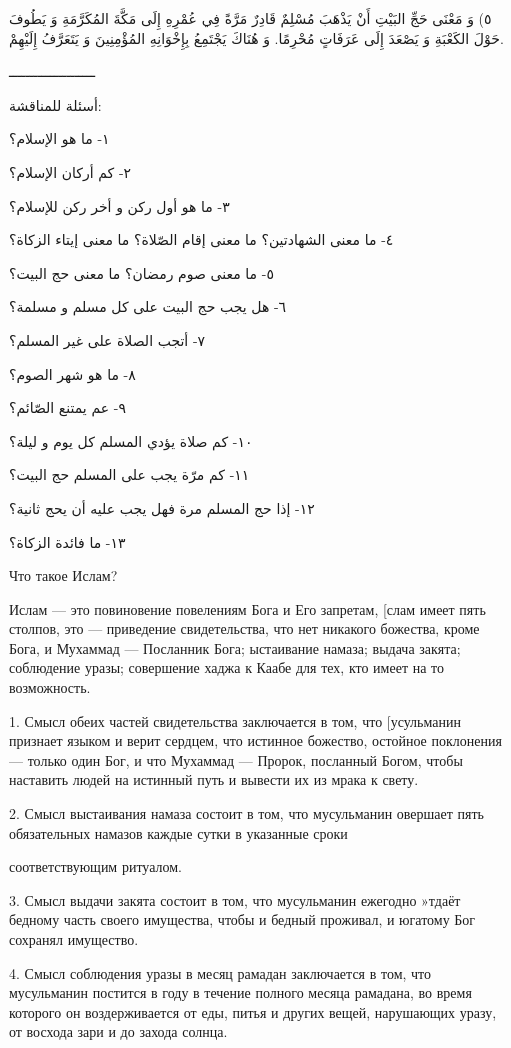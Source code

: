 \documentclass[a5paper]{article}
\begin{document}
٥) وَ مَعْنَى حَجِّ البَيْتِ أَنْ يَذْهَبَ مُسْلِمٌ قَادِرٌ مَرَّةً فِي عُمْرِهِ إِلَى مَكَّةَ المُكَرَّمَةِ وَ يَطُوفَ حَوْلَ الكَعْبَةِ وَ يَصْعَدَ إِلَى عَرَفَاتٍ مُحْرِمًا. وَ هُنَاكَ يَجْتَمِعُ بِإِخْوَانِهِ المُؤْمِنِينَ وَ يَتَعَرَّفُ إِلَيْهِمْ.

ـــــــــــــــــــــ

أسئلة للمناقشة:

١- ما هو الإسلام؟

٢- كم أركان الإسلام؟

٣- ما هو أول ركن و أخر ركن للإسلام؟

٤- ما معنى الشهادتين؟ ما معنى إقام الصّلاة؟ ما معنى إيتاء الزكاة؟

٥- ما معنى صوم رمضان؟ ما معنى حج البيت؟

٦- هل يجب حج البيت على كل مسلم و مسلمة؟

٧- أتجب الصلاة على غير المسلم؟

٨- ما هو شهر الصوم؟

٩- عم يمتنع الصّائم؟

١٠- كم صلاة يؤدي المسلم كل يوم و ليلة؟

١١- كم مرّة يجب على المسلم حج البيت؟

١٢- إذا حج المسلم مرة فهل يجب عليه أن يحج ثانية؟

١٣- ما فائدة الزكاة؟

Что такое Ислам?

Ислам — это повиновение повелениям Бога и Его запретам, [слам имеет пять столпов, это — приведение свидетельства, что нет никакого божества, кроме Бога, и Мухаммад — Посланник Бога; ыстаивание намаза; выдача закята; соблюдение уразы; совершение хаджа к Каабе для тех, кто имеет на то возможность.

1. Смысл обеих частей свидетельства заключается в том, что [усульманин признает языком и верит сердцем, что истинное божество, остойное поклонения — только один Бог, и что Мухаммад — Пророк, посланный Богом, чтобы наставить людей на истинный путь и вывести их из мрака к свету.

2. Смысл выстаивания намаза состоит в том, что мусульманин овершает пять обязательных намазов каждые сутки в указанные сроки

соответствующим ритуалом.

3. Смысл выдачи закята состоит в том, что мусульманин ежегодно »тдаёт бедному часть своего имущества, чтобы и бедный проживал, и югатому Бог сохранял имущество.

4. Смысл соблюдения уразы в месяц рамадан заключается в том, что мусульманин постится в году в течение полного месяца рамадана, во время которого он воздерживается от еды, питья и других вещей, нарушающих уразу, от восхода зари и до захода солнца.
\end{document}
